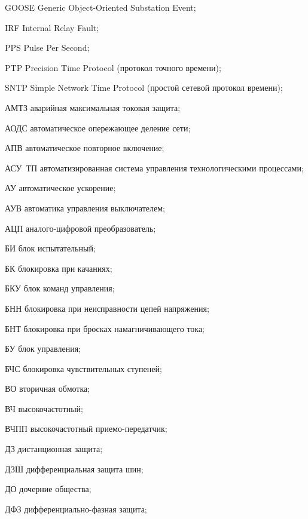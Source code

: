 \begin{list}{}%
{%
  \setlength{\labelwidth}{\abbrwidth}%
  \setlength{\labelsep}{0pt}%
  \setlength{\leftmargin}{\dimexpr\labelwidth+\labelsep\relax}%
  \setlength{\itemindent}{0pt}%
  \setlength{\parsep}{0pt}%
  \setlength{\itemsep}{0pt}
  \renewcommand{\makelabel}[1]{#1 --\hspace{\abbrgap}}%
}
\item[GOOSE] Generic Object-Oriented Substation Event;
\item[IRF] Internal Relay Fault;
\item[PPS] Pulse Per Second;
\item[PTP] Precision Time Protocol (протокол точного времени);
\item[SNTP] Simple Network Time Protocol (простой сетевой протокол времени);
\item[АМТЗ] аварийная максимальная токовая защита;
\item[АОДС] автоматическое опережающее деление сети;
\item[АПВ] автоматическое повторное включение;
\item[АСУ~ТП] автоматизированная система управления технологическими процессами;
\item[АУ] автоматическое ускорение;
\item[АУВ] автоматика управления выключателем;
\item[АЦП] аналого-цифровой преобразователь;
\item[БИ] блок испытательный;
\item[БК] блокировка при качаниях;
\item[БКУ] блок команд управления;
\item[БНН] блокировка при неисправности цепей напряжения;
\item[БНТ] блокировка при бросках намагничивающего тока;
\item[БУ] блок управления;
\item[БЧС] блокировка чувствительных ступеней;
\item[ВО] вторичная обмотка;
\item[ВЧ] высокочастотный;
\item[ВЧПП] высокочастотный приемо-передатчик;
\item[ДЗ] дистанционная защита;
\item[ДЗШ] дифференциальная защита шин;
\item[ДО] дочерние общества;
\item[ДФЗ] дифференциально-фазная защита;

\end{list}
